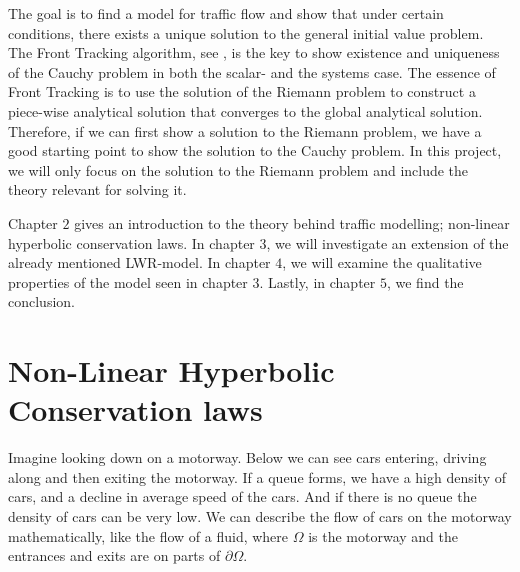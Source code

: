 \documentclass[10pt]{article}
\numberwithin{equation}{section}
\begin{document}
The goal is to find a model for traffic flow and show that under certain conditions, there exists a unique solution to the general initial value problem. The Front Tracking algorithm, see \cite{HoldenH.Helge2015Ftfh}, is the key to show existence and uniqueness of the Cauchy problem in both the scalar- and the systems case.  The essence of Front Tracking is to use the solution of the Riemann problem to construct a piece-wise analytical solution that converges to the global analytical solution. Therefore, if we can first show a solution to the Riemann problem, we have a good starting point to show the solution to the Cauchy problem. In this project, we will only focus on the solution to the Riemann problem and include the theory relevant for solving it. 

Chapter $2$ gives an introduction to the theory behind traffic modelling; non-linear hyperbolic conservation laws. In chapter $3$, we will investigate an extension of the already mentioned LWR-model. In chapter $4$, we will examine the qualitative properties of the model seen in chapter $3$. Lastly, in chapter $5$, we find the conclusion. 
\newpage

\section{Non-Linear Hyperbolic Conservation laws}
Imagine looking down on a motorway. Below we can see cars entering, driving along and then exiting the motorway. If a queue forms, we have a high density of cars, and a decline in average speed of the cars.  And if there is no queue the density of cars can be very low. We can describe the flow of cars on the motorway mathematically, like the flow of a fluid,  where $\Omega$ is the motorway and the entrances and exits are on parts of $\partial \Omega$. 
\end{document}
